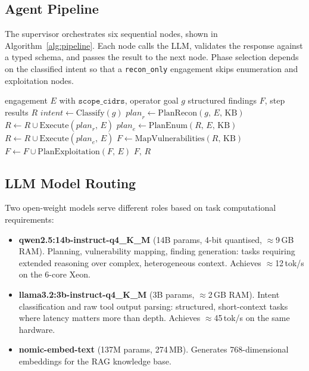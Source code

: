 \documentclass[conference]{IEEEtran}
\begin{document}
\subsection{Agent Pipeline}

The supervisor orchestrates six sequential nodes, shown in
Algorithm~\ref{alg:pipeline}. Each node calls the LLM, validates the
response against a typed schema, and passes the result to the next node.
Phase selection depends on the classified intent so that a
\texttt{recon\_only} engagement skips enumeration and exploitation nodes.

\begin{algorithm}[t]
\caption{PentAI Pro Agent Pipeline}
\label{alg:pipeline}
\small
\begin{algorithmic}[1]
\REQUIRE engagement $E$ with $\texttt{scope\_cidrs}$, operator goal $g$
\ENSURE structured findings $F$, step results $R$
\STATE $\textit{intent} \leftarrow \mathrm{Classify}(g)$ 
\STATE $\textit{plan}_r \leftarrow \mathrm{PlanRecon}(g,\,E,\,\mathrm{KB})$
\STATE $R \leftarrow R \cup \mathrm{Execute}(\textit{plan}_r,\,E)$
  \STATE $\textit{plan}_e \leftarrow \mathrm{PlanEnum}(R,\,E,\,\mathrm{KB})$
  \STATE $R \leftarrow R \cup \mathrm{Execute}(\textit{plan}_e,\,E)$
\ENDIF
{}
  \STATE $F \leftarrow \mathrm{MapVulnerabilities}(R,\,\mathrm{KB})$
  \STATE $F \leftarrow F \cup \mathrm{PlanExploitation}(F,\,E)$
\ENDIF
\RETURN $F,\,R$
\end{algorithmic}
\end{algorithm}

\subsection{LLM Model Routing}

Two open-weight models serve different roles based on task
computational requirements:

\begin{itemize}
\item \textbf{qwen2.5:14b-instruct-q4\_K\_M} (14B params, 4-bit
  quantised, $\approx$9\,GB RAM). Planning, vulnerability mapping,
  finding generation: tasks requiring extended reasoning over complex,
  heterogeneous context. Achieves $\approx$12\,tok/s on the 6-core Xeon.
\item \textbf{llama3.2:3b-instruct-q4\_K\_M} (3B params, $\approx$2\,GB
  RAM). Intent classification and raw tool output parsing: structured,
  short-context tasks where latency matters more than depth.
  Achieves $\approx$45\,tok/s on the same hardware.
\item \textbf{nomic-embed-text} (137M params, 274\,MB). Generates
  768-dimensional embeddings for the RAG knowledge base.
\end{itemize}
\end{document}
